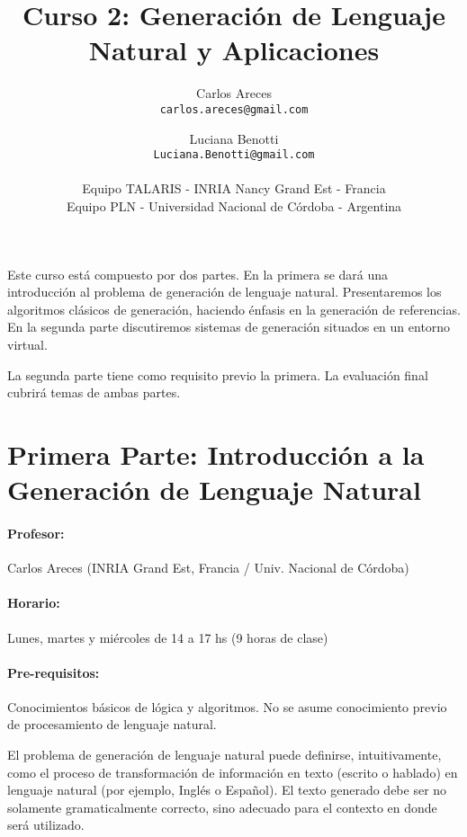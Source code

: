 \documentclass[a4paper]{article}
\begin{document}
\setcounter{page}{1}

\title{Curso 2: Generaci\'on de Lenguaje Natural y Aplicaciones}
\author{Carlos Areces\\
  {\tt carlos.areces@gmail.com} 
\and 
Luciana Benotti\\
  {\tt Luciana.Benotti@gmail.com} \\
 \ \\
  Equipo TALARIS - INRIA Nancy Grand Est - Francia\\
  Equipo PLN - Universidad Nacional de C\'ordoba - Argentina
}


\maketitle

Este curso est\'a compuesto por dos partes. En la primera se dar\'a una introducci\'on al problema de generaci\'on de lenguaje natural. Presentaremos los algoritmos cl\'asicos de generaci\'on, haciendo \'enfasis en la generaci\'on de referencias. En la segunda parte discutiremos sistemas de generaci\'on situados en un entorno virtual.

La segunda parte tiene como requisito previo la primera. La evaluaci\'on final cubrir\'a temas de ambas partes.

\section*{Primera Parte: Introducci\'on a la Generaci\'on de Lenguaje Natural}

\paragraph{Profesor:} Carlos Areces (INRIA Grand Est, Francia / Univ. Nacional de C\'ordoba)

\paragraph{Horario:} Lunes, martes y mi\'ercoles de 14 a 17 hs (9 horas de clase)

\paragraph{Pre-requisitos:} Conocimientos b\'asicos de l\'ogica y algoritmos. No se asume conocimiento previo de procesamiento de lenguaje natural.

El problema de generaci\'on de lenguaje natural puede definirse, intuitivamente, como el proceso de transformaci\'on de informaci\'on en texto (escrito o hablado) en lenguaje natural (por ejemplo, Ingl\'es o Español). El texto generado debe ser no solamente gramaticalmente correcto, sino adecuado para el contexto en donde ser\'a utilizado.
\end{document}
